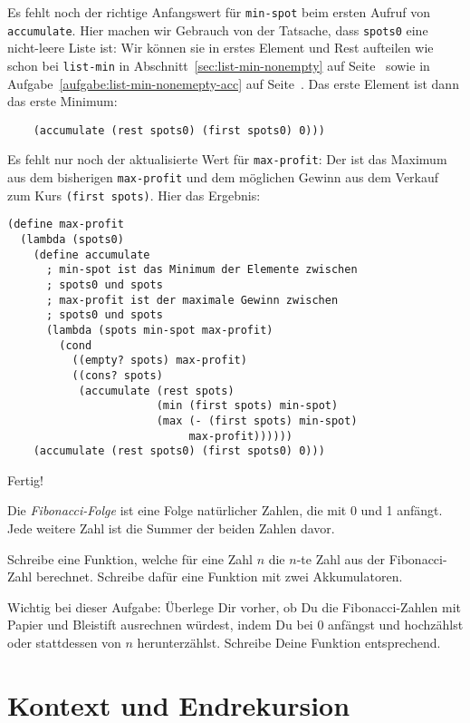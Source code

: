 %
Es fehlt noch der richtige Anfangswert für \lstinline{min-spot} beim
ersten Aufruf von \lstinline{accumulate}.  Hier machen wir Gebrauch
von der Tatsache, dass \lstinline{spots0} eine nicht-leere Liste ist:
Wir können sie in erstes Element und Rest aufteilen wie schon bei
\lstinline{list-min} in Abschnitt~\ref{sec:list-min-nonempty} auf
Seite~\pageref{sec:list-min-nonempty} sowie in
Aufgabe~\ref{aufgabe:list-min-nonemepty-acc} auf
Seite~\pageref{aufgabe:list-min-nonemepty-acc}.  Das erste Element ist
dann das erste Minimum:
%
\begin{lstlisting}
    (accumulate (rest spots0) (first spots0) 0)))
\end{lstlisting}
%
Es fehlt nur noch der aktualisierte Wert für \lstinline{max-profit}:
Der ist das Maximum aus dem bisherigen \lstinline{max-profit} und dem
möglichen Gewinn aus dem Verkauf zum Kurs \lstinline{(first spots)}.
Hier das Ergebnis:
%
\begin{lstlisting}
(define max-profit
  (lambda (spots0)
    (define accumulate
      ; min-spot ist das Minimum der Elemente zwischen
      ; spots0 und spots
      ; max-profit ist der maximale Gewinn zwischen
      ; spots0 und spots
      (lambda (spots min-spot max-profit)
        (cond
          ((empty? spots) max-profit)
          ((cons? spots)
           (accumulate (rest spots)
                       (min (first spots) min-spot)
                       (max (- (first spots) min-spot)
                            max-profit))))))
    (accumulate (rest spots0) (first spots0) 0)))
\end{lstlisting}
%
Fertig!

\begin{aufgabeinline}
  Die \textit{Fibonacci-Folge} ist eine Folge natürlicher Zahlen, die
  mit 0 und 1 anfängt.  Jede weitere Zahl ist die Summer der beiden
  Zahlen davor.

  Schreibe eine Funktion, welche für eine Zahl $n$ die $n$-te Zahl aus
  der Fibonacci-Zahl berechnet.  Schreibe dafür eine Funktion
  mit zwei Akkumulatoren.

  Wichtig bei dieser Aufgabe: Überlege Dir vorher, ob Du die
  Fibonacci-Zahlen mit Papier und Bleistift ausrechnen würdest, indem
  Du bei 0 anfängst und hochzählst oder stattdessen von $n$
  herunterzählst.  Schreibe Deine Funktion entsprechend.
\end{aufgabeinline}

\section{Kontext und Endrekursion}
\label{sec:iteration}

